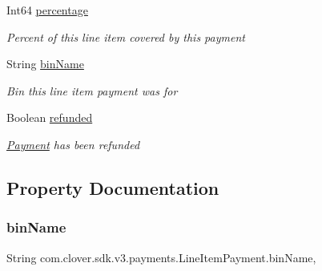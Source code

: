 \begin{DoxyCompactItemize}
Int64 \hyperlink{classcom_1_1clover_1_1sdk_1_1v3_1_1payments_1_1_line_item_payment_afa610c11c1fb3a87628f4f74d98e864e}{percentage}
\begin{DoxyCompactList}\small\item\em Percent of this line item covered by this payment \end{DoxyCompactList}\item 
String \hyperlink{classcom_1_1clover_1_1sdk_1_1v3_1_1payments_1_1_line_item_payment_a8b329f3405745883d6a991441dd54d20}{bin\+Name}
\begin{DoxyCompactList}\small\item\em Bin this line item payment was for \end{DoxyCompactList}\item 
Boolean \hyperlink{classcom_1_1clover_1_1sdk_1_1v3_1_1payments_1_1_line_item_payment_af51ba6631bf7e29f9379566a7bf840b5}{refunded}
\begin{DoxyCompactList}\small\item\em \hyperlink{classcom_1_1clover_1_1sdk_1_1v3_1_1payments_1_1_payment}{Payment} has been refunded \end{DoxyCompactList}\end{DoxyCompactItemize}


\subsection{Property Documentation}
\mbox{\label{classcom_1_1clover_1_1sdk_1_1v3_1_1payments_1_1_line_item_payment_a8b329f3405745883d6a991441dd54d20}} 
\subsubsection{\texorpdfstring{bin\+Name}{binName}}
{\footnotesize\ttfamily String com.\+clover.\+sdk.\+v3.\+payments.\+Line\+Item\+Payment.\+bin\+Name\hspace{0.3cm}{\ttfamily [get]}, {\ttfamily [set]}}



